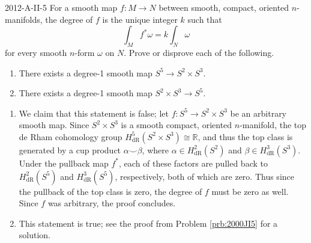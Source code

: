 \documentclass{article}
\begin{document}
	\begin{prb}{2012-A-II-5}
		For a smooth map $f: M \to N$ between smooth, compact, oriented $n$-manifolds, the degree of $f$ is the unique integer $k$ such that 
			\begin{equation*}
				\int_{M}f^{\ast}\omega = k\int_{N}\omega
			\end{equation*}
		for every smooth $n$-form $\omega$ on $N$. Prove or disprove each of the following. \vspace{-0.25cm}
		\begin{enumerate}[itemsep =-2pt,label = (\alph{*})]
			\item There exists a degree-1 smooth map $S^5 \to S^2 \times S^3$. 
			\item There exists a degree-1 smooth map $S^2 \times S^3 \to S^5$. 
		\end{enumerate}
	\end{prb}
	\begin{enumerate}[itemsep =-2pt,label = (\alph{*})]
		\item We claim that this statement is false; let $f: S^{5} \to S^2 \times S^3$ be an arbitrary smooth map. Since $S^2 \times S^3$ is a smooth compact, oriented $n$-manifold, the top de Rham cohomology group $H^{5}_{\text{dR}}(S^2 \times S^3) \cong \mathbb{R}$, and thus the top class is generated by a cup product $\alpha \smile \beta$, where $\alpha \in H^{2}_{\text{dR}}(S^2)$ and $\beta \in H^{3}_{\text{dR}}(S^3)$. Under the pullback map $f^{\ast}$, each of these factors are pulled back to $H^{2}_{\text{dR}}(S^5)$ and $H^{3}_{\text{dR}}(S^{5})$, respectively, both of which are zero. Thus since the pullback of the top class is zero, the degree of $f$ must be zero as well. Since $f$ was arbitrary, the proof concludes. 
		\item This statement is true; see the proof from Problem \ref{prb:2000JI5} for a solution. 
	\end{enumerate}
	
\end{document}
